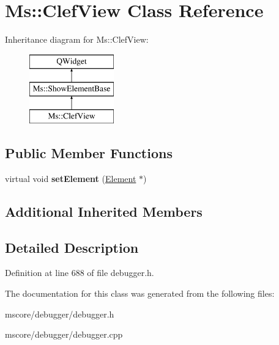 \hypertarget{class_ms_1_1_clef_view}{}\section{Ms\+:\+:Clef\+View Class Reference}
\label{class_ms_1_1_clef_view}
Inheritance diagram for Ms\+:\+:Clef\+View\+:\begin{figure}[H]
\begin{center}
\leavevmode
\includegraphics[height=3.000000cm]{class_ms_1_1_clef_view}
\end{center}
\end{figure}
\subsection*{Public Member Functions}
\begin{DoxyCompactItemize}
\item 
\mbox{\label{class_ms_1_1_clef_view_ab8a433c02ff2a88c3f0b2c592b1b8a77}} 
virtual void {\bfseries set\+Element} (\hyperlink{class_ms_1_1_element}{Element} $\ast$)
\end{DoxyCompactItemize}
\subsection*{Additional Inherited Members}


\subsection{Detailed Description}


Definition at line 688 of file debugger.\+h.



The documentation for this class was generated from the following files\+:\begin{DoxyCompactItemize}
\item 
mscore/debugger/debugger.\+h\item 
mscore/debugger/debugger.\+cpp\end{DoxyCompactItemize}

